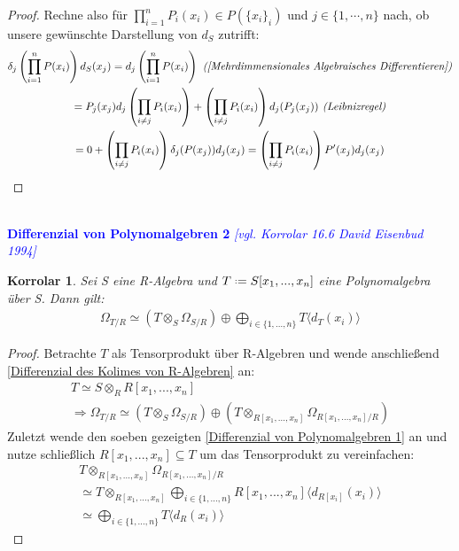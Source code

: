 \documentclass[10pt,a4paper]{report}
\newcommand{\ModulsOfDifferenzials}{David Eisenbud 1994}
\newcounter{Aussage}[chapter]
\newtheorem{korrolar}[Aussage]{Korrolar}
\newcommand{\divR}[2]{\Omega_{#1/#2}}
\newcommand{\divf}[1]{d_{#1}}
\newcommand{\Tensor}[3]{#1 \otimes_{#2} #3}
\newcommand*{\defeq}{\mathrel{\vcenter{\baselineskip0.5ex \lineskiplimit0pt
                     \hbox{\scriptsize.}\hbox{\scriptsize.}}}%
                     =}
\newcommand{\Verz}[1]{\langle #1 \rangle}
\begin{document}
\begin{proof}
Rechne also für $\prod_{i = 1}^n P_i(x_i) \in P(\lbrace x_i \rbrace_i)$ und $j \in \lbrace 1, \cdots , n \rbrace$ nach, ob unsere gewünschte Darstellung von $\divf{S}$ zutrifft:
\begin{gather*}
\delta_{j}\left(\prod_{i = 1}^n P(x_i)\right)\divf{S}(x_j) = \divf{j}\left(\prod_{i = 1}^n P(x_i)\right)
\textit{ (\cref{Mehrdimmensionales Algebraisches Differentieren})}\\
= P_j(x_j)\divf{j} \left( \prod_{i \neq j} P_i(x_i) \right) + \left( \prod_{i \neq j} P_i(x_i) \right) \divf{j}(P_j(x_j))
\textit{ (Leibnizregel)} \\
= 0 + \left( \prod_{i \neq j} P_i(x_i) \right) \delta_j(P(x_j))\divf{j}(x_j)
=  \left( \prod_{i \neq j} P_i(x_i) \right) P'(x_j)\divf{j}(x_j)\\
\end{gather*}
\end{proof}


\ \\
\textcolor{blue}{\textbf{Differenzial von Polynomalgebren 2} \textit{[vgl. Korrolar 16.6 \ModulsOfDifferenzials]}}
\begin{korrolar}\label{Differenzial von Polynomalgebren 2}
Sei S eine R-Algebra und $T \defeq S[x_1,...,x_n]$ eine Polynomalgebra über S. Dann gilt:
\begin{gather*}
\divR{T}{R} \simeq (\Tensor{T}{S}{\divR{S}{R}}) \oplus \bigoplus_{i \in \lbrace 1,...,n \rbrace} T \Verz{\divf{T}(x_i)}
\end{gather*}
\end{korrolar}
\begin{proof}
Betrachte $T$ als Tensorprodukt über R-Algebren und wende anschließend \cref{Differenzial des Kolimes von R-Algebren} an:
\begin{gather*}
T \simeq \Tensor{S}{R}{R[x_1,...,x_n]} \\
\Rightarrow \divR{T}{R} \simeq (\Tensor{T}{S}{\divR{S}{R}}) \oplus (\Tensor{T}{R[x_1,...,x_n]}{\divR{R[x_1,...,x_n]}{R}})
\end{gather*}
Zuletzt wende den soeben gezeigten \cref{Differenzial von Polynomalgebren 1} an und nutze schließlich $R[x_1,...,x_n] \subseteq T$ um das Tensorprodukt zu vereinfachen:
\begin{gather*}
\Tensor{T}{R[x_1,...,x_n]}{\divR{R[x_1,...,x_n]}{R}}\\
\simeq \Tensor{T}{R[x_1,...,x_n]}{\bigoplus_{i \in \lbrace 1,...,n \rbrace} R[x_1,...,x_n]\langle \divf{R[x_i]}(x_i) \rangle } \\
\simeq \bigoplus_{i \in \lbrace 1,...,n \rbrace} T \langle \divf{R}(x_i) \rangle
\end{gather*}
\end{proof}
\end{document}
